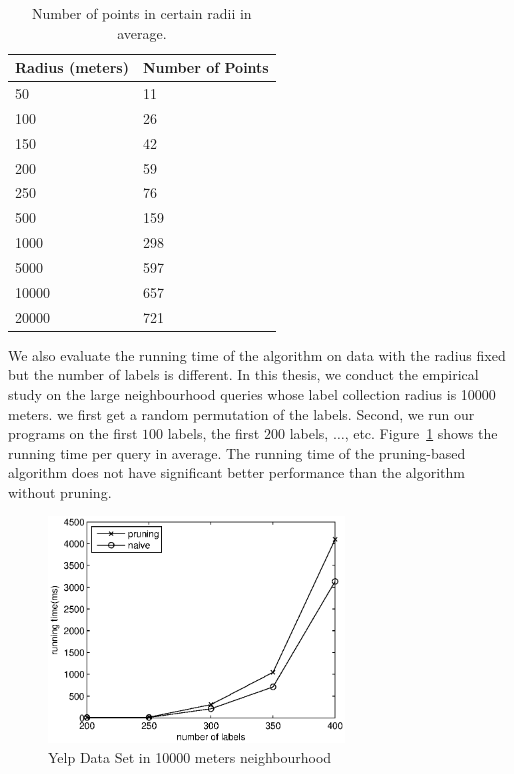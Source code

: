 \begin{table}[h]
\centering
\begin{tabular}{|l|l|}
\hline
Radius (meters) & Number of Points \\ \hline
50              & 11               \\ \hline
100             & 26               \\ \hline
150             & 42               \\ \hline
200             & 59               \\ \hline
250             & 76               \\ \hline
500             & 159              \\ \hline
1000            & 298              \\ \hline
5000            & 597              \\ \hline
10000           & 657              \\ \hline
20000           & 721              \\ \hline
\end{tabular}
\caption{Number of points in certain radii in average.}
\label{tab:exp:radius}
\end{table}

We also evaluate the running time of the algorithm on data with the radius fixed but the number of labels is different. In this thesis, we conduct the empirical study on the large neighbourhood queries whose label collection radius is 10000 meters. we first get a random permutation of the labels. Second, we run our programs on the first $100$ labels, the first $200$ labels, $\dots$, etc. Figure~\ref{fig:exp:yelp10k} shows the running time per query in average. The running time of the pruning-based algorithm does not have significant better performance than the algorithm without pruning.

\begin{figure}[h]
    \centering
      \includegraphics[width=0.7\textwidth]{figs/Yelp10Kmeters}
    \caption{Yelp Data Set in 10000 meters neighbourhood}
    \label{fig:exp:yelp10k}
\end{figure}

